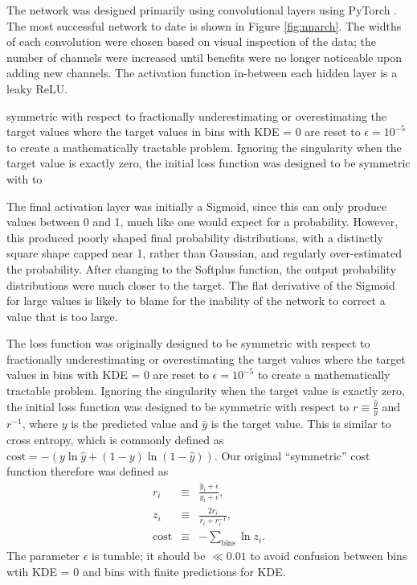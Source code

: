 \documentclass[a4paper]{jpconf}
\begin{document}
The network was designed primarily using convolutional layers using PyTorch \cite{paszke2017automatic}. The most successful network to date is shown in Figure \ref{fig:nnarch}. The widths of each convolution were chosen based on visual inspection of the data; the number of channels were increased until benefits were no longer noticeable upon adding new channels. The activation function in-between each hidden layer is a leaky ReLU.

symmetric with respect to fractionally underestimating or overestimating the target values where the target values in bins with KDE = 0 are reset to $ \epsilon = 10^{-5} $ to create a mathematically tractable problem.  Ignoring the singularity when the target value is exactly zero, the initial loss function was designed to be symmetric with to

The final activation layer was initially a Sigmoid, since this can only produce values between 0 and 1, much like one would expect for a probability. However, this produced poorly shaped final probability distributions, with a distinctly square shape capped near 1, rather than Gaussian, and regularly over-estimated the probability. After changing to the Softplus function, the output probability distributions were much closer to the target. The flat derivative of the Sigmoid for large values is likely to blame for the inability of the network to correct a value that is too large.

The loss function was originally designed to be symmetric with respect to fractionally underestimating or overestimating the target values where the target values in bins with KDE = 0 are reset to $ \epsilon = 10^{-5} $ to create a mathematically tractable problem.  Ignoring the singularity when the target value is exactly zero, the initial loss function was designed to be symmetric with respect to  $r \equiv \frac{\hat y}{y}$ and $r^{-1}$, where $y$ is the predicted value and $\hat y$ is the target value. This is similar to cross entropy, which is commonly defined as
%
$
\mathrm{cost} = - \left(
y \ln \hat y + (1-y) \ln (1 - \hat y)
\right)
$.
%
Our original ``symmetric'' cost function therefore was defined as
\begin{eqnarray}
r_i & \equiv & \frac{\hat y_i + \epsilon}{y_i + \epsilon}, \\
z_i & \equiv & \frac{2 r_i}{r_i + r_i^{-1}}, \\
\mathrm{cost}  & \equiv &- \sum_\mathrm{bins} \ln z_i.
\end{eqnarray}
%
The parameter $ \epsilon $ is tunable; it should be $ \ll 0.01 $ to avoid confusion between bins wtih KDE = 0 and bins with finite predictions for KDE.
\end{document}
